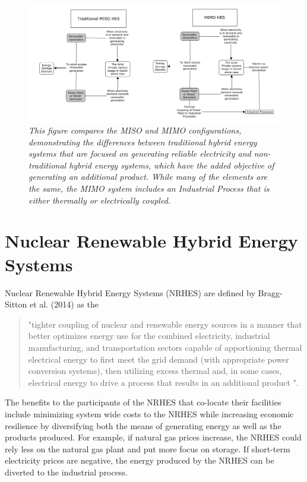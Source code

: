 \begin{figure}
\includegraphics[width=\textwidth]{MISO_MIMO.png}
\caption{\small \sl This figure compares the MISO and MIMO configurations, demonstrating the differences between traditional hybrid energy systems that are focused on generating reliable electricity and non-traditional hybrid energy systems, which have the added objective of generating an additional product.  While many of the elements are the same, the MIMO system includes an Industrial Process  that is either thermally or electrically coupled.}
\end{figure}

\section{Nuclear Renewable Hybrid Energy Systems}
Nuclear Renewable Hybrid Energy Systems (NRHES) are defined by Bragg-Sitton et al. (2014) as the

\begin{quotation}
"tighter coupling of nuclear and renewable energy sources in a manner that better optimizes energy use for the combined electricity, industrial manufacturing, and transportation sectors capable of apportioning thermal electrical energy to first meet the grid demand (with appropriate power conversion systems), then utilizing excess thermal and, in some cases, electrical energy to drive a process that results in an additional product \cite {Bragg-Sitton2014}".
\end{quotation}

The benefits to the participants of the NRHES that co-locate their facilities include minimizing system wide costs to the NRHES while increasing economic resilience by diversifying both the means of generating energy as well as the products produced. For example, if natural gas prices increase, the NRHES could rely less on the natural gas plant and put more focus on storage.  If short-term electricity prices are negative, the energy produced by the NRHES can be diverted to the industrial process.

